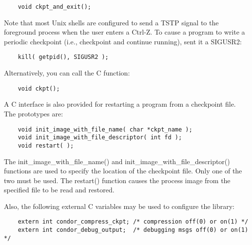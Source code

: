 \begin{verbatim}
	void ckpt_and_exit();
\end{verbatim}

Note that most Unix shells are configured to send a TSTP signal to the
foreground process when the user enters a Ctrl-Z.  To cause a program
to write a periodic checkpoint (i.e., checkpoint and continue
running), sent it a SIGUSR2:

\begin{verbatim}
	kill( getpid(), SIGUSR2 );
\end{verbatim}

Alternatively, you can call the C function:

\begin{verbatim}
	void ckpt();
\end{verbatim}

A C interface is also provided for restarting a program from a
checkpoint file.  The prototypes are:

\begin{verbatim}
	void init_image_with_file_name( char *ckpt_name );
	void init_image_with_file_descriptor( int fd );
	void restart( );
\end{verbatim}

The init\_image\_with\_file\_name() and
init\_image\_with\_file\_descriptor() functions are used to specify
the location of the checkpoint file.  Only one of the two must be
used.  The restart() function causes the process image from the
specified file to be read and restored.

Also, the following external C variables may be used to configure the
library:

\begin{verbatim}
	extern int condor_compress_ckpt; /* compression off(0) or on(1) */
	extern int condor_debug_output;  /* debugging msgs off(0) or on(1) */
\end{verbatim}

